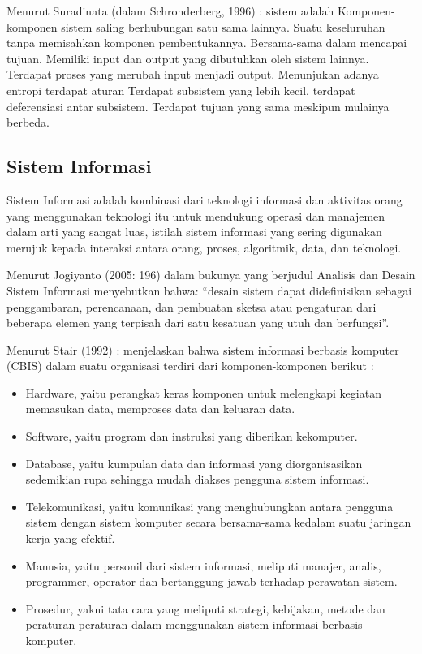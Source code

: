 \documentclass{jtetiproposalskripsi}
\begin{document}
Menurut Suradinata (dalam Schronderberg, 1996) : sistem adalah Komponen-komponen sistem saling berhubungan satu sama lainnya. Suatu keseluruhan tanpa memisahkan komponen pembentukannya. Bersama-sama dalam mencapai tujuan. Memiliki input dan output yang dibutuhkan oleh sistem lainnya. Terdapat proses yang merubah input menjadi output. Menunjukan adanya entropi terdapat aturan Terdapat subsistem yang lebih kecil, terdapat deferensiasi antar subsistem. Terdapat tujuan yang sama meskipun mulainya berbeda.


\subsection{Sistem Informasi}
Sistem Informasi adalah kombinasi dari teknologi informasi dan aktivitas orang yang menggunakan teknologi itu untuk mendukung operasi dan manajemen dalam arti yang sangat luas, istilah sistem informasi yang sering digunakan merujuk kepada interaksi antara orang, proses, algoritmik, data, dan teknologi.

Menurut Jogiyanto (2005: 196) dalam  bukunya yang berjudul Analisis dan Desain Sistem Informasi  menyebutkan  bahwa:  “desain  sistem  dapat  didefinisikan  sebagai penggambaran, perencanaan, dan pembuatan sketsa atau pengaturan dari beberapa elemen yang terpisah dari satu kesatuan yang utuh dan berfungsi”.

Menurut Stair (1992) : menjelaskan bahwa sistem informasi berbasis komputer (CBIS) dalam suatu organisasi terdiri dari komponen-komponen berikut :
\begin{itemize}
\item Hardware, yaitu perangkat keras komponen untuk melengkapi kegiatan memasukan data, memproses data dan keluaran data.
\item Software, yaitu program dan instruksi yang diberikan kekomputer.
\item Database, yaitu kumpulan data dan informasi yang diorganisasikan sedemikian rupa sehingga mudah diakses pengguna sistem informasi.
\item Telekomunikasi, yaitu komunikasi yang menghubungkan antara pengguna sistem dengan sistem komputer secara bersama-sama kedalam suatu jaringan kerja yang efektif.
\item Manusia, yaitu personil dari sistem informasi, meliputi manajer, analis, programmer, operator dan bertanggung jawab terhadap perawatan sistem.
\item Prosedur, yakni tata cara yang meliputi strategi, kebijakan, metode dan peraturan-peraturan dalam menggunakan sistem informasi berbasis komputer.
\end{itemize}
\end{document}
